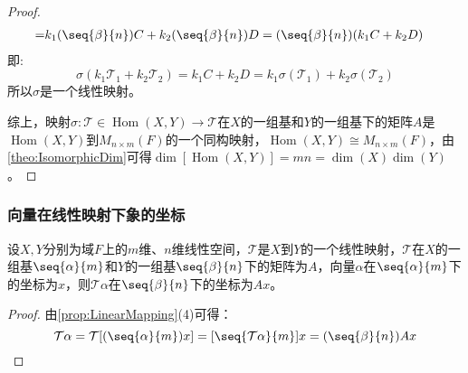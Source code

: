 \begin{proof}
\begin{align*}
		=&k_1(\seq{\beta}{n})C+k_2(\seq{\beta}{n})D=(\seq{\beta}{n})(k_1C+k_2D)
	\end{align*}
	即:
	\begin{equation*}
		\sigma(k_1\mathcal{T}_1+k_2\mathcal{T}_2)=k_1C+k_2D=k_1\sigma(\mathcal{T}_1)+k_2\sigma(\mathcal{T}_2)
	\end{equation*}
	所以$\sigma$是一个线性映射。\par
	综上，映射$\sigma:\mathcal{T}\in\operatorname{Hom}(X,Y)\longrightarrow\mathcal{T}$在$X$的一组基和$Y$的一组基下的矩阵$A$是$\operatorname{Hom}(X,Y)$到$M_{n\times m}(F)$的一个同构映射，$\operatorname{Hom}(X,Y)\cong M_{n\times m}(F)$，由\cref{theo:IsomorphicDim}可得$\dim[\operatorname{Hom}(X,Y)]=mn=\dim(X)\dim(Y)$。
\end{proof}
\subsubsection{向量在线性映射下象的坐标}
\begin{theorem}\label{theo:LinearMappingCoordinate}
	设$X,Y$分别为域$F$上的$m$维、$n$维线性空间，$\mathcal{T}$是$X$到$Y$的一个线性映射，$\mathcal{T}$在$X$的一组基$\seq{\alpha}{m}$和$Y$的一组基$\seq{\beta}{n}$下的矩阵为$A$，向量$\alpha$在$\seq{\alpha}{m}$下的坐标为$x$，则$\mathcal{T}\alpha$在$\seq{\beta}{n}$下的坐标为$Ax$。
\end{theorem}
\begin{proof}
	由\cref{prop:LinearMapping}(4)可得：
	\begin{equation*}
		\mathcal{T}\alpha=\mathcal{T}[(\seq{\alpha}{m})x]=[\seq{\mathcal{T}\alpha}{m}]x=(\seq{\beta}{n})Ax\qedhere
	\end{equation*}
\end{proof}

